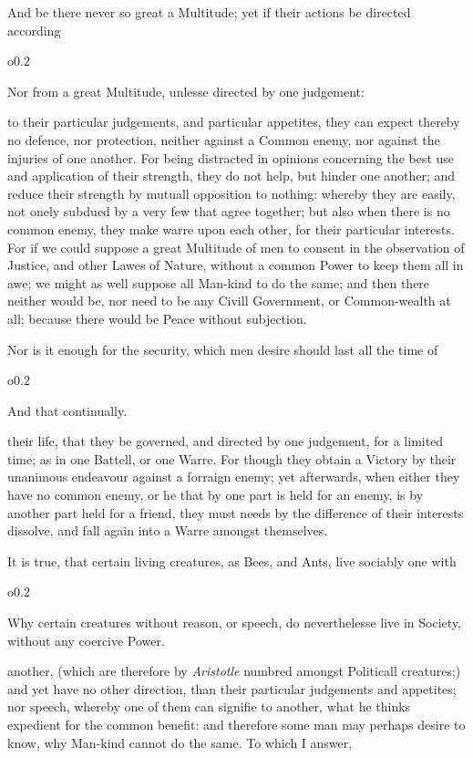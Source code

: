And be there never so great a Multitude; yet if their actions be
directed according \begin{wrapfigure}[6]{o}{0.2\textwidth}\raggedright
Nor from a great Multitude, unlesse directed by one judgement:
\end{wrapfigure} to their particular judgements, and particular
appetites, they can expect thereby no defence, nor protection, neither
against a Common enemy, nor against the injuries of one another. For
being distracted in opinions concerning the best use and application
of their strength, they do not help, but hinder one another; and
reduce their strength by mutuall opposition to nothing: whereby they
are easily, not onely subdued by a very few that agree together; but
also when there is no common enemy, they make warre upon each other,
for their particular interests. For if we could suppose a great
Multitude of men to consent in the observation of Justice, and other
Lawes of Nature, without a common Power to keep them all in awe; we
might  as well suppose all Man-kind to do the same; and then
there neither would be, nor need to be any Civill Government, or
Common-wealth at all; because there would be Peace without subjection.

Nor is it enough for the security, which men desire should last all
the time of \begin{wrapfigure}[4]{o}{0.2\textwidth}\raggedright And
that continually. \end{wrapfigure} their life, that they be governed,
and directed by one judgement, for a limited time; as in one Battell,
or one Warre. For though they obtain a Victory by their unanimous
endeavour against a forraign enemy; yet afterwards, when either they
have no common enemy, or he that by one part is held for an enemy, is
by another part held for a friend, they must needs by the difference
of their interests dissolve, and fall again into a Warre amongst
themselves.

It is true, that certain living creatures, as Bees, and Ants, live
sociably one with \begin{wrapfigure}[8]{o}{0.2\textwidth}\raggedright
Why certain creatures without reason, or speech, do neverthelesse live
in Society, without any coercive Power. \end{wrapfigure} another,
(which are therefore by \textit{Aristotle} numbred amongst Politicall
creatures;) and yet have no other direction, than their particular
judgements and appetites; nor speech, whereby one of them can signifie
to another, what he thinks expedient for the common benefit: and
therefore some man may perhaps desire to know, why Man-kind cannot do
the same. To which I answer,

